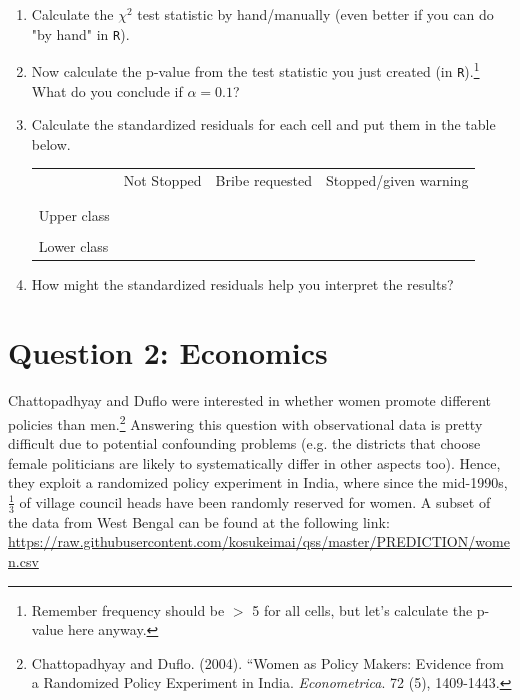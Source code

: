 \documentclass[12pt,letterpaper]{article}
\begin{document}
\begin{enumerate}
	
	\item [(a)]
	Calculate the $\chi^2$ test statistic by hand/manually (even better if you can do "by hand" in \texttt{R}).\\
	\vspace{7cm}
	
	\newpage
	\item [(b)]
	Now calculate the p-value from the test statistic you just created (in \texttt{R}).\footnote{Remember frequency should be $>$ 5 for all cells, but let's calculate the p-value here anyway.}  What do you conclude if $\alpha = 0.1$?\\
		\vspace{7cm}

	\item [(c)] Calculate the standardized residuals for each cell and put them in the table below.
	\vspace{1cm}
	
	\begin{table}[h]
		\centering
		\begin{tabular}{l | c c c }
			& Not Stopped & Bribe requested & Stopped/given warning \\
			\\[-1.8ex] 
			\hline \\[-1.8ex]
			Upper class  &  &  &  \\
			\\
			Lower class &  &   &   \\
			
		\end{tabular}
	\end{table}
	
	
	\vspace{7cm}
	\item [(d)] How might the standardized residuals help you interpret the results?  
	
\end{enumerate}
\newpage

\section*{Question 2: Economics}
Chattopadhyay and Duflo were interested in whether women promote different policies than men.\footnote{Chattopadhyay and Duflo. (2004). ``Women as Policy Makers: Evidence from a Randomized Policy Experiment in India. \textit{Econometrica}. 72 (5), 1409-1443.} Answering this question with observational data is pretty difficult due to potential confounding problems (e.g. the districts that choose female politicians are likely to systematically differ in other aspects too). Hence, they exploit a randomized policy experiment in India, where since the mid-1990s, $\frac{1}{3}$ of village council heads have been randomly reserved for women. A subset of the data from West Bengal can be found at the following link: \url{https://raw.githubusercontent.com/kosukeimai/qss/master/PREDICTION/women.csv}\\
\end{document}
